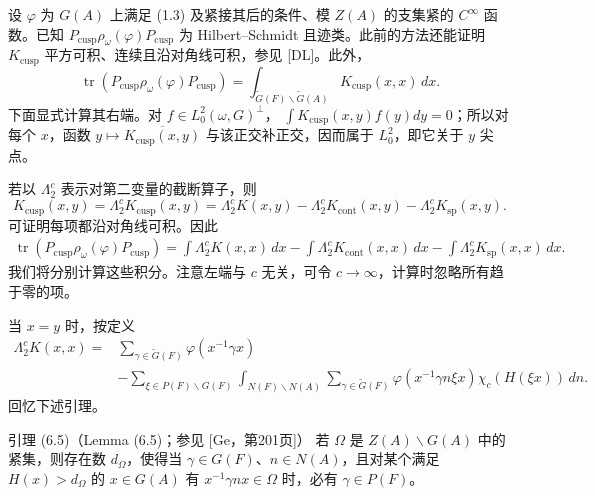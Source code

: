 设 $\varphi$ 为 $G(A)$ 上满足 (1.3) 及紧接其后的条件、模 $Z(A)$ 的支集紧的 $C^\infty$ 函数。已知
$P_{\mathrm{cusp}}\rho_\omega(\varphi)P_{\mathrm{cusp}}$ 为 Hilbert--Schmidt 且迹类。此前的方法还能证明
$K_{\mathrm{cusp}}$ 平方可积、连续且沿对角线可积，参见 [DL]。此外，
\begin{equation}
 \operatorname{tr}(P_{\mathrm{cusp}}\rho_\omega(\varphi)P_{\mathrm{cusp}})
 =\int_{\widetilde G(F)\backslash\widetilde G(A)}K_{\mathrm{cusp}}(x,x)\,dx.\tag{6.1}
\end{equation}
下面显式计算其右端。对 $f\in L_0^2(\omega,G)^\perp$，
$\int K_{\mathrm{cusp}}(x,y)f(y)dy=0$；所以对每个 $x$，函数
$y\mapsto\overline{K_{\mathrm{cusp}}(x,y)}$ 与该正交补正交，因而属于 $L_0^2$，即它关于 $y$ 尖点。

若以 $\Lambda_2^c$ 表示对第二变量的截断算子，则
\begin{equation}
 K_{\mathrm{cusp}}(x,y)=\Lambda_2^cK_{\mathrm{cusp}}(x,y)
 =\Lambda_2^cK(x,y)-\Lambda_2^cK_{\mathrm{cont}}(x,y)-\Lambda_2^cK_{\mathrm{sp}}(x,y).\tag{6.2}
\end{equation}
可证明每项都沿对角线可积。因此
\begin{equation}
\begin{split}
 \operatorname{tr}(P_{\mathrm{cusp}}\rho_\omega(\varphi)P_{\mathrm{cusp}})
 =\int\Lambda_2^cK(x,x)\,dx
 -\int\Lambda_2^cK_{\mathrm{cont}}(x,x)\,dx
 -\int\Lambda_2^cK_{\mathrm{sp}}(x,x)\,dx.
\end{split}\tag{6.3}
\end{equation}
我们将分别计算这些积分。注意左端与 $c$ 无关，可令 $c\to\infty$，计算时忽略所有趋于零的项。

当 $x=y$ 时，按定义
\begin{equation}
\begin{split}
 \Lambda_2^cK(x,x)
 ={}&\sum_{\gamma\in\widetilde G(F)}\varphi(x^{-1}\gamma x)\\
 &-\sum_{\xi\in P(F)\backslash G(F)}\int_{N(F)\backslash N(A)}
 \sum_{\gamma\in\widetilde G(F)}\varphi(x^{-1}\gamma n\xi x)
 \chi_c(H(\xi x))\,dn.
\end{split}\tag{6.4}
\end{equation}
回忆下述引理。
\begin{originaltheorem}{引理 (6.5)（Lemma (6.5)；参见 [Ge，第201页]）}
若 $\Omega$ 是 $Z(A)\backslash G(A)$ 中的紧集，则存在数 $d_\Omega$，使得当
$\gamma\in G(F)$、$n\in N(A)$，且对某个满足 $H(x)>d_\Omega$ 的 $x\in G(A)$ 有
$x^{-1}\gamma nx\in\Omega$ 时，必有 $\gamma\in P(F)$。
\end{originaltheorem}

